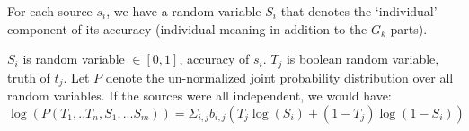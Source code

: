 \documentclass{sig-alternate}
\newcounter{prob}
\begin{document}
For each source $s_i$, we have a random variable $S_i$ that denotes the `individual' component of its accuracy (individual meaning in addition to the $G_k$ parts). 

$S_i$ is random variable $\in \left[0, 1\right]$, accuracy of $s_i$. $T_j$ is boolean random variable, truth of $t_j$. Let $P$ denote the un-normalized joint probability distribution over all random variables. If the sources were all independent, we would have:
$$\log(P(T_1, .. T_n, S_1, ... S_m)) = \Sigma_{i,j} b_{i,j}(T_j\log(S_i) + (1-T_j)\log(1-S_i))$$


\begin{comment}
Later:
Crowdsourcing with budget
Key constraints (part of tuple correlations?)
partial extraction
partial correctness.
\end{comment}



{\small

  
}
\end{document}

